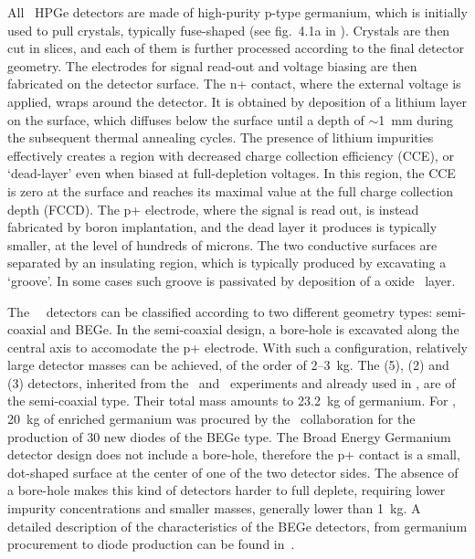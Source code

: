 All \gerda\ HPGe detectors are made of high-purity p-type germanium, which is initially
used to pull crystals, typically fuse-shaped (see fig.~4.1a in \cite{Yonenaga2019}).
Crystals are then cut in slices, and each of them is further processed according to the
final detector geometry. The electrodes for signal read-out and voltage biasing are then
fabricated on the detector surface. The n+ contact, where the external voltage is applied,
wraps around the detector. It is obtained by deposition of a lithium layer on the surface,
which diffuses below the surface until a depth of $\sim$1~mm during the subsequent thermal
annealing cycles. The presence of lithium impurities effectively creates a region with
decreased charge collection efficiency (CCE), or `dead-layer' even when biased at
full-depletion voltages.  In this region, the CCE is zero at the surface and reaches its
maximal value at the full charge collection depth (FCCD). The p+ electrode, where the
signal is read out, is instead fabricated by boron implantation, and the dead layer it
produces is typically smaller, at the level of hundreds of microns. The two conductive
surfaces are separated by an insulating region, which is typically produced by excavating
a `groove'. In some cases such groove is passivated by deposition of a oxide \fillme\
layer.

The \gerda\ \phasetwo\ detectors can be classified according to two different geometry
types: semi-coaxial and BEGe. In the semi-coaxial design, a bore-hole is excavated along
the central axis to accomodate the p+ electrode. With such a configuration, relatively
large detector masses can be achieved, of the order of 2--3~kg. The \ANG{} (5), \RG{} (2)
and \GTF{} (3) detectors, inherited from the \hdm\ and \igex\ experiments and already used
in \phaseone, are of the semi-coaxial type. Their total mass amounts to 23.2~kg of
germanium.  For \phasetwo, 20~kg of enriched germanium was procured by the \gerda\
collaboration for the production of 30 new diodes of the BEGe type. The Broad Energy
Germanium detector design does not include a bore-hole, therefore the p+ contact is a
small, dot-shaped surface at the center of one of the two detector sides. The absence of a
bore-hole makes this kind of detectors harder to full deplete, requiring lower impurity
concentrations and smaller masses, generally lower than 1~kg. A detailed description of
the characteristics of the BEGe detectors, from germanium procurement to diode production
can be found in~\cite{Agostini2015e, Agostini2018a, Agostini2019}.

